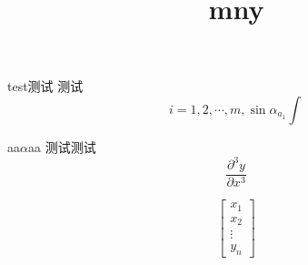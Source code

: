 \documentclass{ctexart}
\title{mny}
\author{}
\begin{document}
\maketitle
test测试
测试
\begin{equation}
    i=1,2,\cdots,m
    , \sin\alpha _{a_1}  \int
\end{equation}

aa$\alpha$aa
测试测试
\begin{equation}
    \frac{\partial^3 y}{\partial x^3}
\end{equation}

\begin{equation}
    \begin{bmatrix} x_1 \\ x_2 \\ \vdots \\ y_n \end{bmatrix}
\end{equation}
\end{document}
